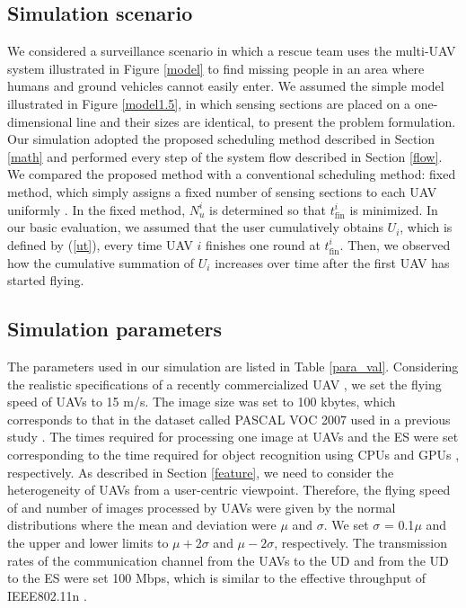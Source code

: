\documentclass{ieeeaccess}
\begin{document}
\subsection{Simulation scenario}
We considered a surveillance scenario in which a rescue team uses the multi-UAV system illustrated in Figure \ref{model} to find missing people in an area where humans and ground vehicles cannot easily enter. We assumed the simple model illustrated in Figure \ref{model1.5}, in which sensing sections are placed on a one-dimensional line and their sizes are identical, to present the problem formulation. Our simulation adopted the proposed scheduling method described in Section \ref{math} and performed every step of the system flow described in Section \ref{flow}. We compared the proposed method with a conventional scheduling method: fixed method, which simply assigns a fixed number of sensing sections to each UAV uniformly \cite{chang2016}. In the fixed method, $N_u^i$ is determined so that $t_{\mathrm{fin}}^i$ is minimized. In our basic evaluation, we assumed that the user cumulatively obtains $U_i$, which is defined by (\ref{ut}), every time UAV $i$ finishes one round at $t_{\mathrm{fin}}^i$. Then, we observed how the cumulative summation of $U_i$ increases over time after the first UAV has started flying.

\subsection{Simulation parameters}
The parameters used in our simulation are listed in Table \ref{para_val}. Considering the realistic specifications of a recently commercialized UAV \cite{bebop2}, we set the flying speed of UAVs to 15 m/s. The image size was set to 100 kbytes, which corresponds to that in the dataset called PASCAL VOC 2007 used in a previous study \cite{Ren2015}. The times required for processing one image at UAVs and the ES were set corresponding to the time required for object recognition using CPUs and GPUs \cite{Ren2015}, respectively. As described in Section \ref{feature}, we need to consider the heterogeneity of UAVs from a user-centric viewpoint. Therefore, the flying speed of and number of images processed by UAVs were given by the normal distributions where the mean and deviation were $\mu$ and $\sigma$. We set $\sigma$ = 0.1$\mu$ and the upper and lower limits to $\mu+2\sigma$ and $\mu-2\sigma$, respectively. The transmission rates of the communication channel from the UAVs to the UD and from the UD to the ES were set 100 Mbps, which is similar to the effective throughput of IEEE802.11n \cite{Li2013}.
\end{document}
